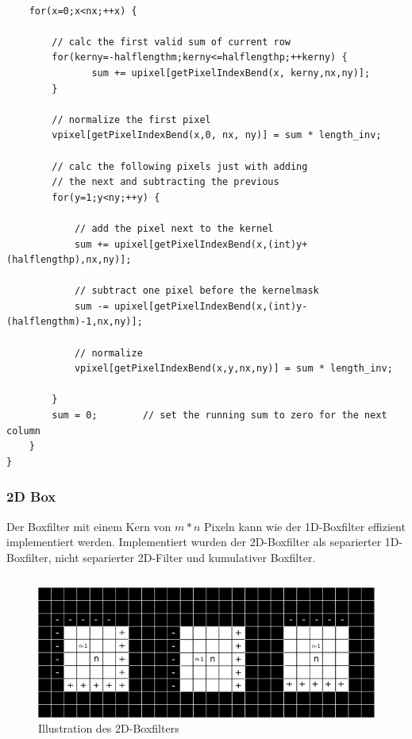 \documentclass[a4paper,12pt]{article}
\begin{document}
\begin{lstlisting}[float,caption={Codeauschnitt 1D Box}]

	for(x=0;x<nx;++x) {

		// calc the first valid sum of current row
		for(kerny=-halflengthm;kerny<=halflengthp;++kerny) {
			   sum += upixel[getPixelIndexBend(x, kerny,nx,ny)];
		}

		// normalize the first pixel
		vpixel[getPixelIndexBend(x,0, nx, ny)] = sum * length_inv;

		// calc the following pixels just with adding 
		// the next and subtracting the previous
		for(y=1;y<ny;++y) {

			// add the pixel next to the kernel
			sum += upixel[getPixelIndexBend(x,(int)y+(halflengthp),nx,ny)];
				
			// subtract one pixel before the kernelmask
			sum -= upixel[getPixelIndexBend(x,(int)y-(halflengthm)-1,nx,ny)];
			
			// normalize
			vpixel[getPixelIndexBend(x,y,nx,ny)] = sum * length_inv;

		}
		sum = 0;        // set the running sum to zero for the next column
	}
}
\end{lstlisting}
 

\newpage

\subsubsection{2D Box}
Der Boxfilter mit einem Kern von $m \ast n$ Pixeln kann wie der 1D-Boxfilter
effizient implementiert werden. Implementiert wurden der 2D-Boxfilter als
separierter 1D-Boxfilter, nicht separierter 2D-Filter und kumulativer
Boxfilter.\\



\begin{verbatim}
\end{verbatim}


\begin{figure}[htbp]
\centering
\includegraphics[scale=1.5]{Box2D.png}%
\caption{Illustration des 2D-Boxfilters}%
\label{figure_ill_box2d}
\end{figure}
\end{document}
